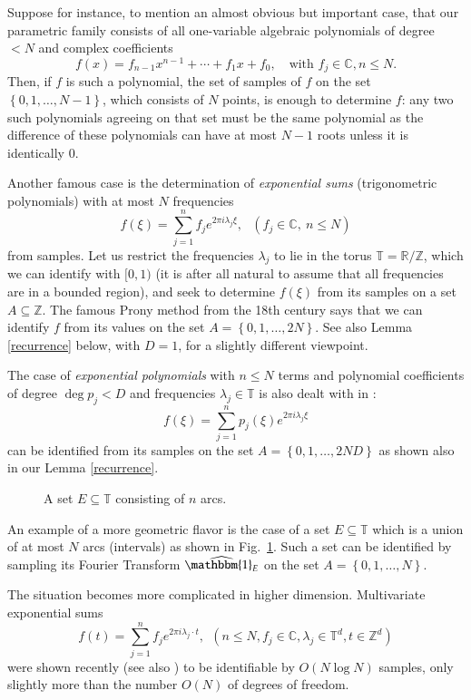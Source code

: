 \documentclass[12pt,a4paper,oneside]{amsart}
\theoremstyle{definition}
\newcommand{\Set}[1]{{\left\{{#1}\right\}}}
\newcommand{\RR}{{\mathbb R}}
\newcommand{\CC}{{\mathbb C}}
\newcommand{\ZZ}{{\mathbb Z}}
\newcommand{\TT}{{\mathbb T}}
\newcommand{\one}{{\mathbbm{1}}}
\newcommand{\ft}[1]{\widehat{#1}}
\newcommand{\red}[1]{{#1}}
\begin{document}
Suppose for instance, to mention an almost obvious but important case, that our parametric family consists of all one-variable algebraic polynomials of degree $< N$ and complex coefficients
$$
f(x) = f_{n-1} x^{n-1} + \cdots + f_1 x + f_0,\ \ \ \text{ with }f_j \in \CC, n \le N.
$$
Then, if $f$ is such a polynomial, the set of samples of $f$ on the set $\Set{0, 1, \ldots, N-1}$, which consists of $N$ points, is enough to determine $f$: any two such polynomials agreeing on that set must be the same polynomial as the difference of these polynomials can have at most $N-1$ roots unless it is identically 0.

Another famous case is the determination of \textit{exponential sums} (trigonometric polynomials) with at most $N$ frequencies
$$
f(\xi) = \sum_{j=1}^n f_j e^{2\pi i \lambda_j \xi},\ \ \ (f_j \in \CC,\ n \le N)
$$
from samples. Let us restrict the frequencies $\lambda_j$ to lie in the torus $\TT = \RR/\ZZ$, which we can identify with $[0, 1)$ \red{(it is after all natural to assume that all frequencies are in a bounded region)}, and seek to determine $f(\xi)$ from its samples on a set $A \subseteq \ZZ$. The famous Prony method from the 18th century \cite{prony1795essai,diederichs2023many,vetterli2002sampling} says that we can identify $f$ from its values on the set $A = \Set{0, 1, \ldots, 2N}$. See also Lemma \ref{recurrence} below, with $D=1$, for a slightly different viewpoint.

The case of \textit{exponential polynomials} with $n \le N$ terms and polynomial coefficients of degree $\deg p_j < D$ \red{and frequencies $\lambda_j \in \TT$} is also dealt with in \cite{vetterli2002sampling}:
$$
f(\xi) = \sum_{j=1}^n p_j(\xi) e^{2\pi i \lambda_j \xi}
$$
can be identified from its samples on the set $A = \Set{0, 1, \ldots, 2ND}$ as shown also in our Lemma \ref{recurrence}.

\begin{figure}[h]
 
 \caption{A set $E \subseteq \TT$ consisting of $n$ arcs.}\label{fig:arcs}
\end{figure}

An example of a more geometric flavor \cite{courtney2010unions,diederichs2023many} is the case of a set $E \subseteq \TT$ which is a union of at most $N$ arcs (intervals) as shown in Fig.\ \ref{fig:arcs}. Such a set can be identified by sampling its Fourier Transform $\ft{\one_E}$ on the set $A = \Set{0, 1, \ldots, N}$.

The situation becomes more complicated in higher dimension. Multivariate exponential sums
$$
f(t) = \sum_{j=1}^n f_j e^{2\pi i \lambda_j \cdot t},\ \ (n \le N,f_j \in \CC,  \lambda_j \in \TT^d, t \in \ZZ^d)
$$
were shown recently \cite{diederichs2023many} (see also \cite{sauer2018prony}) to be identifiable by $O(N \log N)$ samples, only slightly more than the number $O(N)$ of degrees of freedom.
\end{document}
